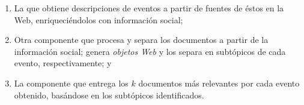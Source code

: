 \begin{enumerate}
\item La que obtiene descripciones de eventos a partir de fuentes de
      éstos en la Web, enriqueciéndolos con información social;
\item Otra componente que procesa y separa los documentos a partir de
      la información social; genera \emph{objetos Web} y los separa en
      subtópicos de cada evento, respectivamente; y
\item La componente que entrega los $k$ documentos más relevantes por
      cada evento obtenido, basándose en los subtópicos identificados.
\end{enumerate}